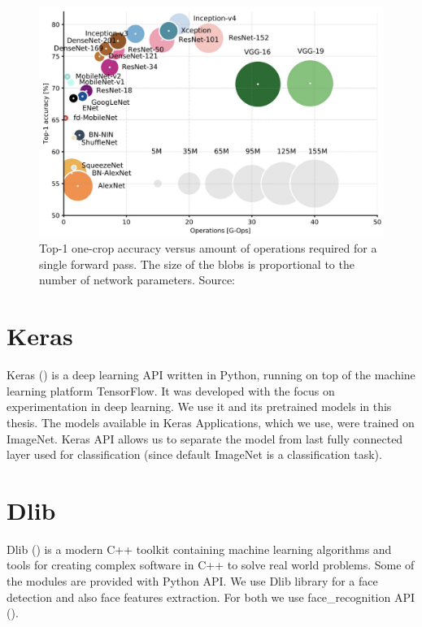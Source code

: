\begin{figure}
    \centering
	\includegraphics[width=0.8\linewidth]{img/network-comparison.jpeg}
	\caption{Top-1 one-crop accuracy versus amount of operations required for a single forward pass. The size of the blobs is proportional to the number of network parameters. Source: \cite{canziani2016analysis}}
	\label{fig:camera-setup}
\end{figure}

\section{Keras}

Keras (\cite{chollet2015keras}) is a deep learning API written in Python, running on top of the machine learning platform TensorFlow\cite{tensorflow2015-whitepaper}. It was developed with the focus on experimentation in deep learning. We use it and its pretrained models in this thesis. The models available in Keras Applications, which we use, were trained on ImageNet. Keras API allows us to separate the model from last fully connected layer used for classification (since default ImageNet is a classification task). 

\section{Dlib}
Dlib (\cite{king2009dlib}) is a modern C++ toolkit containing machine learning algorithms and tools for creating complex software in C++ to solve real world problems. Some of the modules are provided with Python API. We use Dlib library for a face detection and also face features extraction. For both we use face\_recognition API (\cite{geitgey2016machine}).










